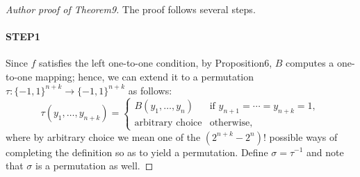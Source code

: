 \documentclass[10pt,a4paper]{article}
\begin{document}
\begin{proof}[Author proof of Theorem9]
The proof follows several steps.
\paragraph{STEP1}
Since $f$ satisfies the left one-to-one condition, by Proposition6, $B$ computes a one-to-one mapping; hence, we can extend it to a permutation $\tau:\{-1,1\}^{n+k}\to\{-1,1\}^{n+k}$ as follows:
\[\tau(y_1,\ldots,y_{n+k})=\begin{cases}B(y_1,\ldots,y_n)&\text{if }y_{n+1}=\cdots=y_{n+k}=1,\\\text{arbitrary choice}&\text{otherwise},\end{cases}\]
where by arbitrary choice we mean one of the $(2^{n+k}-2^n)!$ possible ways of completing the definition so as to yield a permutation. Define $\sigma=\tau^{-1}$ and note that $\sigma$ is a permutation as well.

\end{proof}
\end{document}
